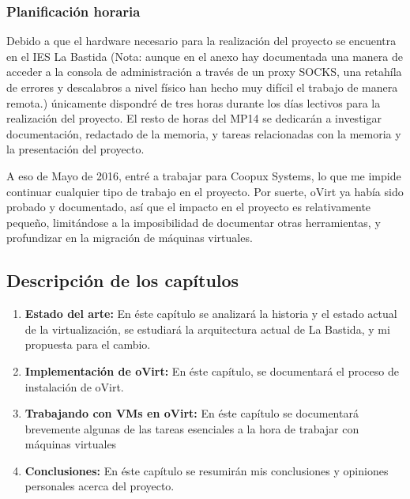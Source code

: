 % 

\subsubsection{Planificación horaria}
\label{subsubsec:hores}

Debido a que el hardware necesario para la realización del proyecto se encuentra en el IES La Bastida (Nota: aunque en el anexo hay documentada una manera de acceder a la consola de administración a través de un proxy SOCKS, una retahíla de errores y descalabros a nivel físico han hecho muy difícil el trabajo de manera remota.) únicamente dispondré de tres horas durante los días lectivos para la realización del proyecto. El resto de horas del MP14 se dedicarán a investigar documentación, redactado de la memoria, y tareas relacionadas con la memoria y la presentación del proyecto.

A eso de Mayo de 2016, entré a trabajar para Coopux Systems, lo que me impide continuar cualquier tipo de trabajo en el proyecto. Por suerte, oVirt ya había sido probado y documentado, así que el impacto en el proyecto es relativamente pequeño, limitándose a la imposibilidad de documentar otras herramientas, y profundizar en la migración de máquinas virtuales.

\subsection{Descripción de los capítulos}
\label{subsec:chaps}

\begin{enumerate}
    \item \textbf{Estado del arte: } En éste capítulo se analizará la historia y el estado actual de la virtualización, se estudiará la arquitectura actual de La Bastida, y mi propuesta para el cambio.
    \item \textbf{Implementación de oVirt: } En éste capítulo, se documentará el proceso de instalación de oVirt.
    \item \textbf{Trabajando con VMs en oVirt: } En éste capítulo se documentará brevemente algunas de las tareas esenciales a la hora de trabajar con máquinas virtuales
    \item \textbf{Conclusiones: } En éste capítulo se resumirán mis conclusiones y opiniones personales acerca del proyecto.
\end{enumerate}
\clearpage
